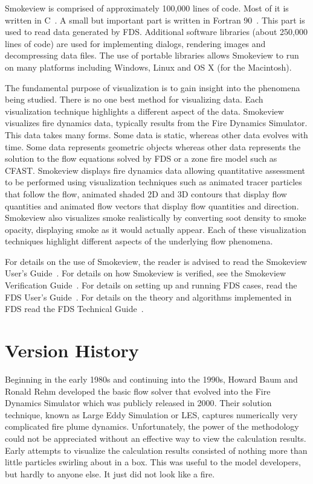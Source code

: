 \documentclass[11pt,twoside]{book}
\begin{document}
Smokeview is comprised of approximately 100,000 lines of code. Most of it is written in C~\cite{C:book}. A small but important part is written in Fortran 90~\cite{Fortran:book}.  This part is used to read data generated by FDS.  Additional software libraries (about 250,000 lines of code) are used for implementing dialogs, rendering images and decompressing data files. The use of portable libraries allows Smokeview to run on many platforms including Windows, Linux and OS X (for the Macintosh).

The fundamental purpose of visualization is to gain insight into the phenomena being studied. There is no one best method for visualizing data. Each visualization technique highlights a different aspect of the data. Smokeview visualizes fire dynamics data, typically results from the Fire Dynamics Simulator. This
data takes many forms.  Some data is static, whereas other data evolves with time. Some data represents geometric objects whereas other data represents the solution to the flow equations solved by FDS or a zone fire model such as CFAST. Smokeview displays fire dynamics data allowing quantitative assessment to be performed using visualization techniques such as animated tracer particles that follow the flow, animated shaded 2D and 3D contours that display flow quantities and animated flow vectors that display flow quantities and direction. Smokeview also visualizes smoke realistically by converting soot density to smoke opacity, displaying smoke as it would actually appear. Each of these visualization techniques highlight different aspects of the underlying flow phenomena.

For details on the use of Smokeview, the reader is advised to read the Smokeview User's Guide~\cite{Smokeview_Users_Guide}. For details on how Smokeview is verified, see the Smokeview Verification Guide~\cite{Smokeview_Verification_Guide}.  For details on setting up and running FDS cases, read the FDS User's Guide~\cite{FDS_Users_Guide}.  For details on the theory and algorithms implemented in FDS read the FDS Technical Guide~\cite{FDS_Tech_Guide}.

%
%

\section{Version History}

Beginning in the early 1980s and continuing into the 1990s, Howard Baum and Ronald Rehm developed the basic flow solver that evolved into the Fire Dynamics Simulator which was publicly released in 2000\cite{McGrattan:6}.  Their solution technique, known as Large Eddy Simulation or LES, captures numerically very complicated fire plume dynamics.  Unfortunately, the power of the methodology could not be appreciated without an effective way to view the calculation results.  Early attempts to visualize the calculation results consisted of nothing more than little particles swirling about in a box.  This was useful to the model developers, but hardly to anyone else.  It just did not look like a fire.
\end{document}
